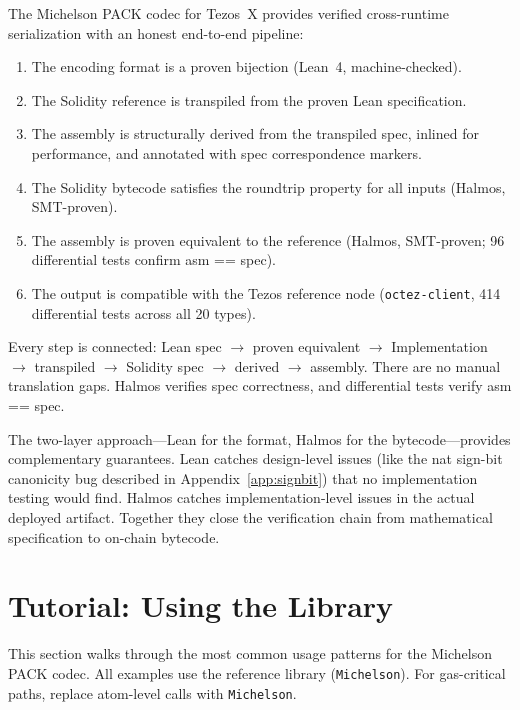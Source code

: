 \documentclass[11pt,a4paper]{article}
\begin{document}
The Michelson PACK codec for Tezos~X provides verified cross-runtime
serialization with an honest end-to-end pipeline:

\begin{enumerate}
  \item The encoding format is a proven bijection (Lean~4, machine-checked).
  \item The Solidity reference is transpiled from the proven Lean specification.
  \item The assembly is structurally derived from the transpiled spec, inlined
    for performance, and annotated with spec correspondence markers.
  \item The Solidity bytecode satisfies the roundtrip property for all inputs
    (Halmos, SMT-proven).
  \item The assembly is proven equivalent to the reference
    (Halmos, SMT-proven; 96 differential tests confirm asm == spec).
  \item The output is compatible with the Tezos reference node (\texttt{octez-client},
    414 differential tests across all 20 types).
\end{enumerate}

Every step is connected: Lean spec $\to$ proven equivalent $\to$ Implementation
$\to$ transpiled $\to$ Solidity spec $\to$ derived $\to$ assembly. There are no
manual translation gaps. Halmos verifies spec correctness, and differential
tests verify asm == spec.

The two-layer approach---Lean for the format, Halmos for the bytecode---provides
complementary guarantees. Lean catches design-level issues (like the nat
sign-bit canonicity bug described in Appendix~\ref{app:signbit}) that no
implementation testing would find. Halmos catches implementation-level issues
in the actual deployed artifact. Together they close the verification chain
from mathematical specification to on-chain bytecode.

\section{Tutorial: Using the Library}

This section walks through the most common usage patterns for the Michelson
PACK codec. All examples use the reference library (\texttt{Michelson}).
For gas-critical paths, replace atom-level calls with
\texttt{Michelson}.
\end{document}

